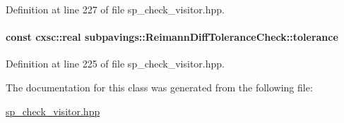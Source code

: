 \-Definition at line 227 of file sp\-\_\-check\-\_\-visitor.\-hpp.

\hypertarget{classsubpavings_1_1ReimannDiffToleranceCheck_a169f5efe98a632fc95bc8bd39f963193}{
\paragraph[{tolerance}]{\setlength{\rightskip}{0pt plus 5cm}const cxsc\-::real {\bf subpavings\-::\-Reimann\-Diff\-Tolerance\-Check\-::tolerance}}}\label{classsubpavings_1_1ReimannDiffToleranceCheck_a169f5efe98a632fc95bc8bd39f963193}


\-Definition at line 225 of file sp\-\_\-check\-\_\-visitor.\-hpp.



\-The documentation for this class was generated from the following file\-:\begin{DoxyCompactItemize}
\item 
\hyperlink{sp__check__visitor_8hpp}{sp\-\_\-check\-\_\-visitor.\-hpp}\end{DoxyCompactItemize}
